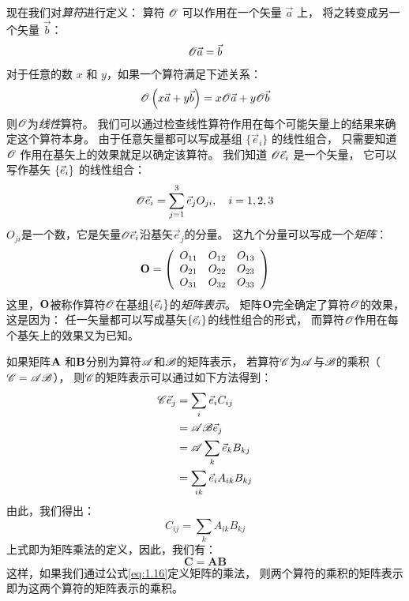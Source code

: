 现在我们对\emph{算符}进行定义：
算符 $\mathscr{O}$ 可以作用在一个矢量 $\vec{a}$ 上，
将之转变成另一个矢量 $\vec{b}$：
\begin{equation}
 \mathscr{O}\vec{a} = \vec{b}
 \label{eq:1.11}
\end{equation}
对于任意的数 $x$ 和 $y$，如果一个算符满足下述关系：
\begin{equation}
 \mathscr{O}\left(x\vec{a} + y\vec{b}\right) = x\mathscr{O}\vec{a} + y\mathscr{O}\vec{b}
 \label{eq:1.12}
\end{equation}
则$\mathscr{O}$为\emph{线性}算符。
我们可以通过检查线性算符作用在每个可能矢量上的结果来确定这个算符本身。
由于任意矢量都可以写成基组 $\{\vec{e}_i\}$ 的线性组合，
只需要知道 $\mathscr{O}$ 作用在基矢上的效果就足以确定该算符。
我们知道 $\mathscr{O}\vec{e}_i$ 是一个矢量，
它可以写作基矢 $\left\{ \vec{e}_{i} \right\}$ 的线性组合：
\begin{equation}
 \mathscr{O}\vec{e}_i = \sum_{j=1}^3 \vec{e}_j O_{ji}, \quad i = 1, 2, 3
 \label{eq:1.13}
\end{equation}
$O_{ji}$是一个数，它是矢量$\mathscr{O}\vec{e}_i$沿基矢$\vec{e}_j$的分量。
这九个分量可以写成一个\emph{矩阵}：
\begin{equation}
 \mathbf{O} = \left(
 \begin{array}{ccc}
     O_{11} &O_{12} &O_{13} \\
     O_{21} &O_{22} &O_{23} \\
     O_{31} &O_{32} &O_{33} \\
 \end{array}
 \right)
 \label{eq:1.14}
\end{equation}
这里，$\mathbf{O}$被称作算符$\mathscr{O}$在基组$\left\{ \vec{e}_{i} \right\}$的\emph{矩阵表示}。
矩阵$\mathbf{O}$完全确定了算符$\mathscr{O}$的效果，
这是因为：
任一矢量都可以写成基矢$\left\{ \vec{e}_{i} \right\}$的线性组合的形式，
而算符$\mathscr{O}$作用在每个基矢上的效果又为已知。


如果矩阵$\mathbf{A}$ 和$\mathbf{B}$分别为算符$\mathscr{A}$和$\mathscr{B}$的矩阵表示， 
若算符$\mathscr{C}$为$\mathscr{A}$与$\mathscr{B}$的乘积（$\mathscr{C} = \mathscr{A}\mathscr{B}$），
则$\mathscr{C}$的矩阵表示可以通过如下方法得到：
\begin{equation}
 \begin{split}
 \mathscr{C}\vec{e}_j &= \sum_i \vec{e}_i C_{ij} \\
 &= \mathscr{A}\mathscr{B} \vec{e}_j \\
 &= \mathscr{A}\sum_k \vec{e}_k B_{kj} \\
 &= \sum_{ik} \vec{e}_i A_{ik}B_{kj}
 \end{split} 
 \label{eq:1.15}
\end{equation}
由此，我们得出：
\begin{equation}
 C_{ij} = \sum_k A_{ik}B_{kj}
 \label{eq:1.16}
\end{equation}
上式即为矩阵乘法的定义，因此，我们有：
\begin{equation}
 \mathbf{C} = \mathbf{A}\mathbf{B}
 \label{eq:1.17}
\end{equation}
这样，如果我们通过公式\eqref{eq:1.16}定义矩阵的乘法，
则两个算符的乘积的矩阵表示即为这两个算符的矩阵表示的乘积。

